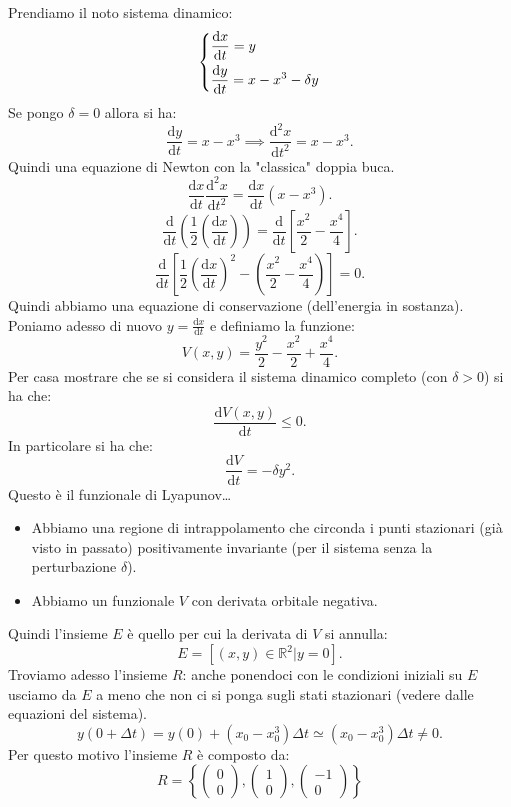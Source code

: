 \begin{exmp}[Duffling]
    Prendiamo il noto sistema dinamico:
    \[
    \begin{dcases}
    \frac{\text{d} x}{\text{d} t} = y\\
    \frac{\text{d} y}{\text{d} t} = x-x^3-\delta y
    \end{dcases}
    \]
    Se pongo $\delta = 0$  allora si ha:
    \[
        \frac{\text{d} y}{\text{d} t} = x-x^3\implies  \frac{\text{d} ^2x}{\text{d} t^2} = x-x^3
    .\] 
    Quindi una equazione di Newton con la "classica" doppia buca.
    \[
	\frac{\text{d} x}{\text{d} t} \frac{\text{d} ^2x}{\text{d} t^2} = \frac{\text{d} x}{\text{d} t} (x-x^3) 
    .\] 
    \[
	\frac{\text{d} }{\text{d} t} \left(\frac{1}{2} \left(\frac{\text{d} x}{\text{d} t}\right)\right)= 
	\frac{\text{d} }{\text{d} t} \left[\frac{x^2}{2}-\frac{x^4}{4}\right]
    .\] 
    \[
        \frac{\text{d} }{\text{d} t} \left[\frac{1}{2}\left(\frac{\text{d} x}{\text{d} t} \right)^2- \left(\frac{x^2}{2} - \frac{x^4}{4}\right) \right] = 0
    .\] 
    Quindi abbiamo una equazione di conservazione (dell'energia in sostanza).\\
    Poniamo adesso di nuovo $y = \frac{\text{d} x}{\text{d} t}$  e definiamo la funzione:
    \[
	V(x, y) = \frac{y^2}{2}-\frac{x^2}{2} + \frac{x^4}{4}
    .\] 
    Per casa mostrare che se si considera il sistema dinamico completo (con $\delta>0$) si ha che:
    \[
	\frac{\text{d} V(x, y) }{\text{d} t} \le 0
    .\] 
    In particolare si ha che:
    \[
        \frac{\text{d} V}{\text{d} t} = -\delta y^2
    .\] 
    Questo è il funzionale di Lyapunov\ldots
    \begin{itemize}
	\item Abbiamo una regione di intrappolamento che circonda i punti stazionari (già visto in passato) positivamente invariante (per il sistema senza la perturbazione $\delta$).
	\item Abbiamo un funzionale $V$ con derivata orbitale negativa.
    \end{itemize}
    Quindi l'insieme $E$ è quello per cui la derivata di $V$ si annulla:
    \[
	E = \left[(x, y) \in \mathbb{R}^2| y = 0\right]
    .\] 
    Troviamo adesso l'insieme $R$: anche ponendoci con le condizioni iniziali su $E$ usciamo da $E$ a meno che non ci si ponga sugli stati stazionari (vedere dalle equazioni del sistema).
    \[
	y(0 + \Delta t) = y(0) + (x_0-x_0^3) \Delta t\simeq (x_0-x_0^3) \Delta t \neq 0
    .\] 
    Per questo motivo l'insieme $R$ è composto da:
    \[
        R = \left\{\begin{pmatrix} 0 \\ 0 \end{pmatrix}, \begin{pmatrix} 1 \\ 0 \end{pmatrix}, \begin{pmatrix} -1 \\ 0 \end{pmatrix}\right\}
\]
\end{exmp}
